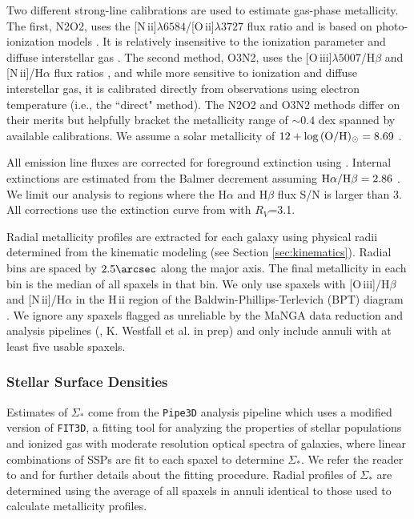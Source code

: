 \documentclass[fleqn,usenatbib]{mnras}
\newcommand{\HII}{{{\sc H\,ii}}}
\newcommand{\NII}{{{\sc N\,ii}}}
\newcommand{\OII}{{{\sc O\,ii}}}
\newcommand{\OIII}{{{\sc O\,iii}}}
\begin{document}
Two different strong-line calibrations are used to estimate gas-phase metallicity. The first, N2O2, uses the 
[\NII]$\lambda6584$/[\OII]$\lambda3727$ flux ratio and is based on photo-ionization models \citep{Kewley02}. It is relatively
insensitive to the ionization parameter and diffuse interstellar gas \citep{Zhang17}. The second method,
O3N2, uses the [\OIII]$\lambda5007$/H$\beta$ and [\NII]/H$\alpha$ flux ratios \citep{Marino13}, and while more sensitive to ionization
and diffuse interstellar gas, it is calibrated directly from observations using electron temperature (i.e., the ``direct" method). The N2O2 and O3N2 methods differ on their merits but helpfully bracket the
metallicity range of ${\sim}0.4$ dex spanned by available calibrations. We assume a solar metallicity of $12+\log{({\rm
    O/H})_{\odot}}=8.69$ \citep{Asplund09}.

All emission line fluxes are corrected for foreground extinction using \citet{Schlegel98}. Internal extinctions are estimated from
the Balmer decrement assuming \mbox{${\rm H}\alpha/{\rm H}\beta=2.86$} \citep{Osterbrock06}. We limit our analysis to regions
where the H$\alpha$ and H$\beta$ flux S/N is larger than 3. All corrections use the extinction curve 
from \citet{Fitzpatrick99} with $R_V$=3.1.

Radial metallicity profiles are extracted for each galaxy using physical radii determined from the kinematic modeling (see
Section \ref{sec:kinematics}).  Radial bins are spaced by $2.5\arcsec$ along the major axis. The final metallicity in each bin is the median of all spaxels in
that bin. We only use spaxels with [\OIII]/H$\beta$ and [\NII]/H$\alpha$ in the {\HII} region of the
Baldwin-Phillips-Terlevich (BPT) diagram \citep{Kewley06b}. We ignore any spaxels flagged as unreliable by the MaNGA data
reduction and analysis pipelines (\citealt{Law16}, K. Westfall et al. in prep) and only include annuli with at least five usable spaxels.

\subsubsection{Stellar Surface Densities}
Estimates of $\Sigma_*$ come from the \texttt{Pipe3D} analysis pipeline which uses a modified version of \texttt{FIT3D}, a fitting tool for analyzing the properties of stellar populations and ionized gas with moderate resolution optical spectra of galaxies, where linear combinations of SSPs are fit to each spaxel to determine $\Sigma_*$.  We refer the reader to \citep{Sanchez16a} and \citep{Sanchez16b} for further details about the fitting procedure. Radial profiles of $\Sigma_*$ are determined using the average of all spaxels in annuli identical to those used to calculate metallicity profiles.
\end{document}
